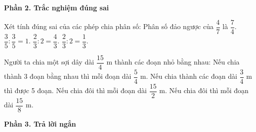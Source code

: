 \textbf{Phần 2. Trắc nghiệm đúng sai}

\begin{ex} %
Xét tính đúng sai của các phép chia phân số:
\choiceTF
{\True Phân số đảo ngược của $\dfrac{4}{7}$ là $\dfrac{7}{4}$.}
{\True $\dfrac{3}{5} : \dfrac{3}{5} = 1$.}
{$\dfrac{2}{3} : 2 = \dfrac{4}{3}$.}
{\True $\dfrac{2}{3} : 2 = \dfrac{1}{3}$.}
\end{ex}

\begin{ex} %
Người ta chia một sợi dây dài $\dfrac{15}{4}\text{ m}$ thành các đoạn nhỏ bằng nhau:
\choiceTF
{\True Nếu chia thành 3 đoạn bằng nhau thì mỗi đoạn dài $\dfrac{5}{4}\text{ m}$.}
{\True Nếu chia thành các đoạn dài $\dfrac{3}{4}\text{ m}$ thì được 5 đoạn.}
{Nếu chia đôi thì mỗi đoạn dài $\dfrac{15}{2}\text{ m}$.}
{\True Nếu chia đôi thì mỗi đoạn dài $\dfrac{15}{8}\text{ m}$.}
\end{ex}

\textbf{Phần 3. Trả lời ngắn}

